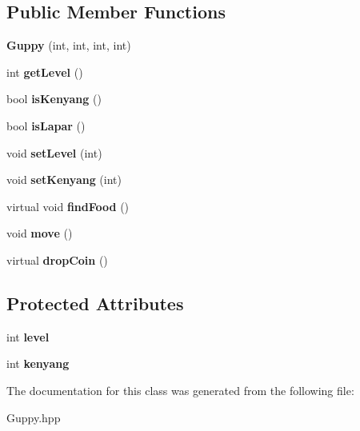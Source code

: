 \subsection*{Public Member Functions}
\begin{DoxyCompactItemize}
\item 
\mbox{\label{class_guppy_a28662f8f82c743d7c01deac586e6ca5e}} 
{\bfseries Guppy} (int, int, int, int)
\item 
\mbox{\label{class_guppy_a60e492213ba14f89484b9f26c0a6a414}} 
int {\bfseries get\+Level} ()
\item 
\mbox{\label{class_guppy_a7567664b093759516cd155a1764847e6}} 
bool {\bfseries is\+Kenyang} ()
\item 
\mbox{\label{class_guppy_a49961b1bcd93d43496f081d1732ddce8}} 
bool {\bfseries is\+Lapar} ()
\item 
\mbox{\label{class_guppy_aa9a5c199be094098529c973ba403087e}} 
void {\bfseries set\+Level} (int)
\item 
\mbox{\label{class_guppy_ac8ff64e3a7e8ea83284971ef698d8823}} 
void {\bfseries set\+Kenyang} (int)
\item 
\mbox{\label{class_guppy_adcf0c39769a6bfd1c3046af0d464b3a8}} 
virtual void {\bfseries find\+Food} ()
\item 
\mbox{\label{class_guppy_ae6002948d74b3741bed34a7311be4377}} 
void {\bfseries move} ()
\item 
\mbox{\label{class_guppy_ad67e3b60be4e541b15e90b9e6581a920}} 
virtual {\bfseries drop\+Coin} ()
\end{DoxyCompactItemize}
\subsection*{Protected Attributes}
\begin{DoxyCompactItemize}
\item 
\mbox{\label{class_guppy_aad3ed21afd22dd1ff36bcbe3e3e9022f}} 
int {\bfseries level}
\item 
\mbox{\label{class_guppy_aa02c8accc01fc84c6f9d38d128912f4e}} 
int {\bfseries kenyang}
\end{DoxyCompactItemize}


The documentation for this class was generated from the following file\+:\begin{DoxyCompactItemize}
\item 
Guppy.\+hpp\end{DoxyCompactItemize}
